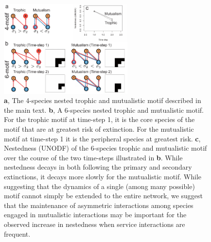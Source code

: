 \documentclass[twocolumn,preprintnumbers,amsmath,amssymb,superscriptaddress,linenumbers]{revtex4-1}
\newcommand{\rr}[1]{{\rm #1}}
\begin{document}
% 





\begin{figure}[h!]
\centering
\includegraphics[width=0.6\textwidth]{fig_motif.pdf}
\caption{
\textbf{a}, The 4-species nested trophic and mutualistic motif described in the main text.
\textbf{b}, A 6-species nested trophic and mutualistic motif. For the trophic motif at time-step 1, it is the core species of the motif that are at greatest risk of extinction. For the mutualistic motif at time-step 1 it is the peripheral species at greatest risk.
\textbf{c}, Nestedness (UNODF) of the 6-species trophic and mutualistic motif over the course of the two time-steps illustrated in \textbf{b}. While nestedness decays in both following the primary and secondary extinctions, it decays more slowly for the mutualistic motif.
While suggesting that the dynamics of a single (among many possible) motif cannot simply be extended to the entire network, we suggest that the maintenance of asymmetric interactions among species engaged in mutualistic interactions may be important for the observed increase in nestedness when service interactions are frequent.
}
\label{fig:motif}
\end{figure}
\end{document}
